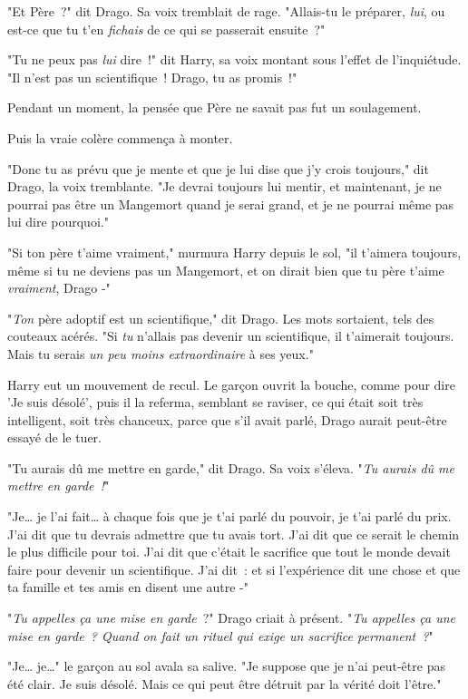 "Et Père~?" dit Drago. Sa voix tremblait de rage. "Allais-tu le préparer, \emph{lui}, ou est-ce que tu t'en \emph{fichais} de ce qui se passerait ensuite~?"

"Tu ne peux pas \emph{lui} dire~!" dit Harry, sa voix montant sous l'effet de l'inquiétude. "Il n'est pas un scientifique~! Drago, tu as promis~!"

Pendant un moment, la pensée que Père ne savait pas fut un soulagement.

Puis la vraie colère commença à monter.

"Donc tu as prévu que je mente et que je lui dise que j'y crois toujours," dit Drago, la voix tremblante. "Je devrai toujours lui mentir, et maintenant, je ne pourrai pas être un Mangemort quand je serai grand, et je ne pourrai même pas lui dire pourquoi."

"Si ton père t'aime vraiment," murmura Harry depuis le sol, "il t'aimera toujours, même si tu ne deviens pas un Mangemort, et on dirait bien que tu père t'aime \emph{vraiment}, Drago -"

"\emph{Ton} père adoptif est un scientifique," dit Drago. Les mots sortaient, tels des couteaux acérés. "Si \emph{tu} n'allais pas devenir un scientifique, il t'aimerait toujours. Mais tu serais \emph{un peu moins extraordinaire} à ses yeux."

Harry eut un mouvement de recul. Le garçon ouvrit la bouche, comme pour dire 'Je suis désolé', puis il la referma, semblant se raviser, ce qui était soit très intelligent, soit très chanceux, parce que s'il avait parlé, Drago aurait peut-être essayé de le tuer.

"Tu aurais dû me mettre en garde," dit Drago. Sa voix s'éleva. "\emph{Tu aurais dû me mettre en garde~!}"

"Je… je l'ai fait… à chaque fois que je t'ai parlé du pouvoir, je t'ai parlé du prix. J'ai dit que tu devrais admettre que tu avais tort. J'ai dit que ce serait le chemin le plus difficile pour toi. J'ai dit que c'était le sacrifice que tout le monde devait faire pour devenir un scientifique. J'ai dit~: et si l'expérience dit une chose et que ta famille et tes amis en disent une autre -"

"\emph{Tu appelles ça une mise en garde}~?" Drago criait à présent. "\emph{Tu appelles ça une mise en garde~? Quand on fait un rituel qui exige un sacrifice permanent~?}"

"Je… je…" le garçon au sol avala sa salive. "Je suppose que je n'ai peut-être pas été clair. Je suis désolé. Mais ce qui peut être détruit par la vérité doit l'être."

